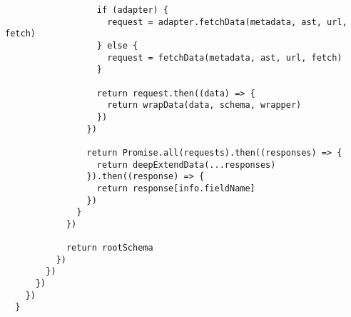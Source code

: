 \begin{verbatim}
                  if (adapter) {
                    request = adapter.fetchData(metadata, ast, url, fetch)
                  } else {
                    request = fetchData(metadata, ast, url, fetch)
                  }

                  return request.then((data) => {
                    return wrapData(data, schema, wrapper)
                  })
                })

                return Promise.all(requests).then((responses) => {
                  return deepExtendData(...responses)
                }).then((response) => {
                  return response[info.fieldName]
                })
              }
            })

            return rootSchema
          })
        })
      })
    })
  }
\end{verbatim}
